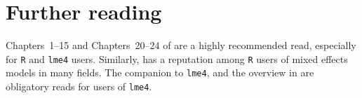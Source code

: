 \documentclass[graybox]{svmult}
\begin{document}


\section{Further reading}
\label{sec:furtherreading}

Chapters~1--15 and Chapters~20--24 of \citet{GelmanHill2006} are a highly recommended read, especially for \texttt{R} and \texttt{lme4} users.
Similarly, \citet{ZuurEa2009} has a reputation among \texttt{R} users of mixed effects models in many fields.
The companion to \texttt{lme4}, \citet{Bates2010} and the overview in \citet{BatesEa2015} are obligatory reads for users of \texttt{lme4}.

\printbibliography
%
\end{document}
